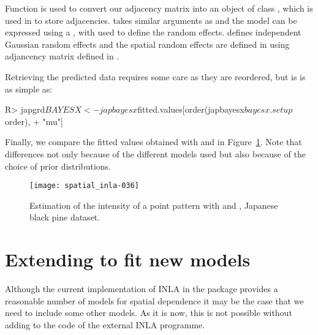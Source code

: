 \documentclass[article]{jss}
\begin{document}
\noindent
Function  is used to convert our adjacency matrix into
an object of class , which is used in  to store 
adjacencies.  takes similar arguments as 
and the model can be expressed using a , with 
used to define the random effects.  defines
independent Gaussian random effects and  the spatial random effects
are defined in 
 using adjancency matrix defined in .

Retrieving the predicted data requires some care as they are reordered,
but is is as simple as:
\begin{Schunk}
\begin{Sinput}
R> japgrd$BAYESX<-japbayesx$fitted.values[order(japbayesx$bayesx.setup$order),
+     "mu"]
\end{Sinput}
\end{Schunk}
\noindent
Finally, we compare the fitted values obtained with  and
 in Figure~\ref{fig:inlabayesx}. Note that differences not only
because of the different models used but also because of the choice of
prior distributions.



\begin{figure}[h]
\begin{center}
\texttt{[image: spatial\_inla-036]}
\caption{Estimation of the intensity of a point pattern with  and , Japanese black pine dataset.}
\label{fig:inlabayesx}
\end{center}
\end{figure}





\section[Extending {R-INLA} to fit new models]{Extending  to fit new models} 

\label{sec:extINLA}


Although the current implementation of INLA in the  package
provides a reasonable number of models for spatial dependence it may be the
case that we need to include some other models. As it is now, this is not
possible without adding to the code of the external INLA programme.
\end{document}
